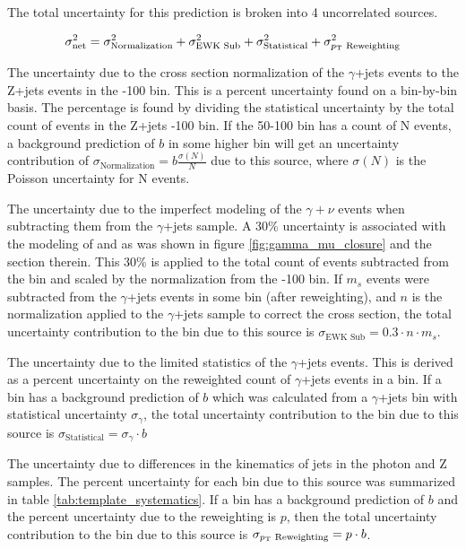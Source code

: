       The total uncertainty for this prediction is broken into 4 uncorrelated sources.

      \[
        \sigma^2_{\text{net}} = \sigma^2_{\text{Normalization}} +  \sigma^2_{\text{EWK Sub}} + \sigma^2_{\text{Statistical}} + \sigma^2_{\text{\pt Reweighting}}
      \]

      \begin{itemize}
         The uncertainty due to the cross section normalization of the $\gamma$+jets events to the Z+jets events in the -100 bin. This is a percent uncertainty found on a bin-by-bin basis. The percentage is found by dividing the statistical uncertainty by the total count of events in the Z+jets -100 bin. If the 50-100 \MET bin has a count of N events, a background prediction of $b$ in some higher \MET bin will get an uncertainty contribution of $ \sigma_{\text{Normalization}} = b \frac{\sigma(N)}{N}$ due to this source, where $\sigma(N)$ is the Poisson uncertainty for N events.

         The uncertainty due to the imperfect modeling of the $\gamma + \nu$ events when subtracting them from the $\gamma$+jets sample. A 30\% uncertainty is associated with the modeling of \pt and \MET as was shown in figure \ref{fig:gamma_mu_closure} and the section therein. This 30\% is applied to the total count of events subtracted from the \MET bin and scaled by the normalization from the -100 bin. If $m_s$ events were subtracted from the $\gamma$+jets events in some \MET bin (after \pt reweighting), and $n$ is the normalization applied to the $\gamma$+jets sample to correct the cross section, the total uncertainty contribution to the \MET bin due to this source is $\sigma_{\text{EWK Sub}} = 0.3 \cdot n \cdot m_s$.

         The uncertainty due to the limited statistics of the $\gamma$+jets events. This is derived as a percent uncertainty on the \pt reweighted count of $\gamma$+jets events in a \MET bin. If a \MET bin has a background prediction of $b$ which was calculated from a $\gamma$+jets \MET bin with statistical uncertainty $\sigma_{\gamma}$, the total uncertainty contribution to the \MET bin due to this source is $\sigma_{\text{Statistical}} = \sigma_{\gamma} \cdot b$

         The uncertainty due to differences in the kinematics of jets in the photon and Z samples. The percent uncertainty for each \MET bin due to this source was summarized in table \ref{tab:template_systematics}. If a \MET bin has a background prediction of $b$ and the percent uncertainty due to the \pt reweighting is $p$, then the total uncertainty contribution to the \MET bin due to this source is $\sigma_{\text{\pt Reweighting}} = p \cdot b$.
      \end{itemize}

